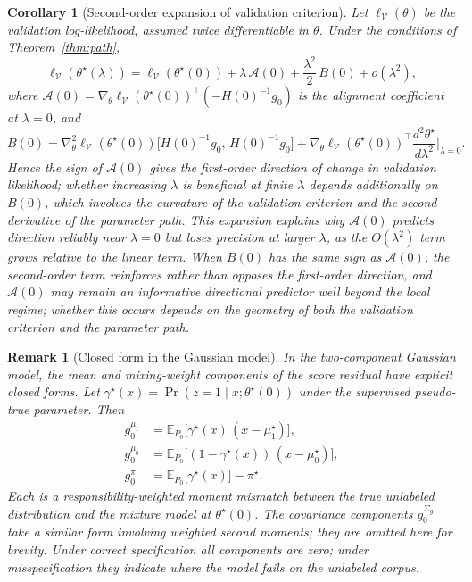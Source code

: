 \documentclass[11pt]{article}
\newtheorem{corollary}{Corollary}[theorem]
\newtheorem{remark}{Remark}
\theoremstyle{definition}
\newcommand{\E}{\mathbb{E}}
\newcommand{\lam}{\lambda}
\newcommand{\Sig}{\Sigma}
\newcommand{\calV}{\mathcal{V}}
\newcommand{\calA}{\mathcal{A}}
\begin{document}
\begin{corollary}[Second-order expansion of validation criterion]
\label{cor:second-order}
Let \(\ell_{\calV}(\theta)\) be the validation log-likelihood, assumed twice
differentiable in \(\theta\).
Under the conditions of Theorem~\ref{thm:path},
\begin{equation}
\label{eq:second-order}
\ell_{\calV}(\theta^\star(\lam))
= \ell_{\calV}(\theta^\star(0))
+ \lam\,\calA(0)
+ \frac{\lam^2}{2}\,B(0)
+ o(\lam^2),
\end{equation}
where \(\calA(0) = \nabla_\theta\ell_{\calV}(\theta^\star(0))^\top
(-H(0)^{-1}g_0)\) is the alignment coefficient at \(\lam=0\), and
\[
B(0)
= \nabla^2_\theta\ell_{\calV}(\theta^\star(0))\bigl[H(0)^{-1}g_0,\,H(0)^{-1}g_0\bigr]
+ \nabla_\theta\ell_{\calV}(\theta^\star(0))^\top\frac{d^2\theta^\star}{d\lam^2}\!\Big|_{\lam=0}.
\]
Hence the sign of \(\calA(0)\) gives the first-order direction of change in
validation likelihood; whether increasing \(\lam\) is beneficial at finite
\(\lam\) depends additionally on \(B(0)\), which involves the curvature of the
validation criterion and the second derivative of the parameter path.
This expansion explains why \(\calA(0)\) predicts direction reliably near
\(\lam=0\) but loses precision at larger \(\lam\), as the \(O(\lam^2)\) term
grows relative to the linear term.
When \(B(0)\) has the same sign as \(\calA(0)\), the second-order term
reinforces rather than opposes the first-order direction, and
\(\calA(0)\) may remain an informative directional predictor well beyond
the local regime; whether this occurs depends on the geometry of both
the validation criterion and the parameter path.
\end{corollary}

\begin{remark}[Closed form in the Gaussian model]
\label{rem:g0-gaussian}
In the two-component Gaussian model, the mean and mixing-weight components
of the score residual have explicit closed forms.
Let \(\gamma^\star(x)=\Pr(z=1\mid x;\theta^\star(0))\) under the supervised
pseudo-true parameter.
Then
\begin{align*}
g_0^{\mu_1} &= \E_{P_0}\!\bigl[\gamma^\star(x)\,(x-\mu_1^\star)\bigr], \\
g_0^{\mu_0} &= \E_{P_0}\!\bigl[(1-\gamma^\star(x))\,(x-\mu_0^\star)\bigr], \\
g_0^{\pi}   &= \E_{P_0}\!\bigl[\gamma^\star(x)\bigr] - \pi^\star.
\end{align*}
Each is a responsibility-weighted moment mismatch between
the true unlabeled distribution and the mixture model at \(\theta^\star(0)\).
The covariance components \(g_0^{\Sig_g}\) take a similar form involving
weighted second moments; they are omitted here for brevity.
Under correct specification all components are zero; under misspecification
they indicate where the model fails on the unlabeled corpus.
\end{remark}
\end{document}
